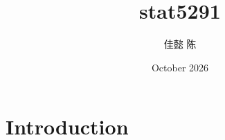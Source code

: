 \documentclass{article}
\title{stat5291}
\author{佳懿 陈}
\date{October 2026}
\begin{document}
\maketitle

\section{Introduction}
\end{document}
